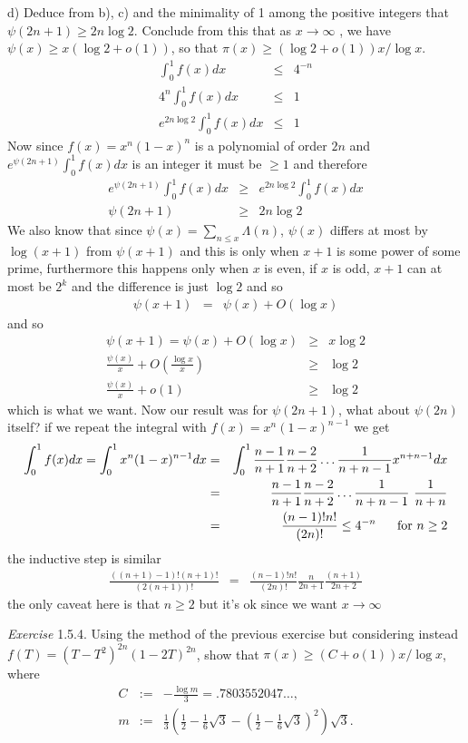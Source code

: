 \documentclass[aps,preprint,preprintnumbers,nofootinbib,showpacs,prd]{revtex4-1}
\newcommand{\nbea}{\begin{eqnarray*}}
\newcommand{\neea}{\end{eqnarray*}}
\begin{document}
d) Deduce from b), c) and the minimality of 1 among the positive integers that $\psi(2n + 1) \ge 2n \log 2$. Conclude from this that as $x \to \infty$ , we have $\psi(x) \ge x(\log 2 + o(1))$, so that $\pi(x) \ge (\log 2 + o(1))x/ \log x$.
%
\nbea
\int^1_0 f(x) dx & \le & 4^{-n} \\
4^{n} \int^1_0 f(x) dx & \le & 1 \\
e^{2n \log 2} \int^1_0 f(x) dx & \le & 1
\neea
%
Now since $f(x) = x^n(1-x)^n$ is a polynomial of order $2n$ and $e^{\psi(2n+1)}\int_0^1 f(x) dx$ is an integer it must be $\ge 1$ and therefore
%
\nbea
e^{\psi(2n+1)}\int_0^1 f(x) dx & \ge & e^{2n \log 2} \int^1_0 f(x) dx \\
\psi(2n+1) & \ge & 2n \log 2
\neea
%
We also know that since $\psi(x) = \sum_{n\le x} \Lambda(n)$, $\psi(x)$ differs at most by $\log (x + 1)$ from $\psi(x+1)$ and this is only when $x + 1$ is some power of some prime, furthermore this happens only when $x$ is even, if $x$ is odd, $x+1$ can at most be $2^k$ and the difference is just $\log 2$ and so
%
\nbea
\psi(x+1) & = & \psi(x) + O(\log x)
\neea
%
and so
%
\nbea
\psi(x+1) = \psi(x) + O(\log x) & \ge & x \log 2 \\
\frac{\psi(x)}{x} + O \left ( \frac{\log x}{x} \right ) & \ge & \log 2 \\
\frac{\psi(x)}{x} + o(1) & \ge & \log 2
\neea
%
which is what we want. Now our result was for $\psi(2n+1)$, what about $\psi(2n)$ itself? if we repeat the integral with $f(x) = x^n(1-x)^{n-1}$ we get
%
\nbea
\int^1_0 f(x) dx = \int_0^1 x^n(1-x)^{n-1} dx & = & \int_0^1 \frac{n-1}{n+1} \frac{n-2}{n+2} \dots \frac{1}{n + n - 1} x^{n+n - 1} dx \\
& = & \frac{n-1}{n+1} \frac{n-2}{n+2} \dots \frac{1}{n + n - 1} ~ \frac{1}{n + n} \\
& = & \frac{(n-1)!n!}{(2n)!} \le 4^{-n} ~~~~~ {\rm for~} n \ge 2
\neea
%
the inductive step is similar
%
\nbea
\frac{((n+1)-1)!(n+1)!}{(2(n+1))!} & = & \frac{(n-1)!n!}{(2n)!} \frac{n}{2n+1} \frac{(n+1)}{2n+2}
\neea
%
the only caveat here is that $n \ge 2$ but it's ok since we want $x \to \infty$

{\it Exercise} 1.5.4. Using the method of the previous exercise but considering instead $f(T) = (T - T^2)^{2n} (1 - 2T)^{2n}$, show that $\pi(x) \ge (C + o(1))x/ \log x$, where
%
\nbea
C & := & - \frac{\log m}{3} = .7803552047 \dots , \\
m & := & \frac{1}{3} \left( \frac{1}{2} - \frac{1}{6}\sqrt{3} - \left( \frac{1}{2} - \frac{1}{6}\sqrt{3} \right )^2 \right ) \sqrt{3}.
\neea
%
\end{document}
